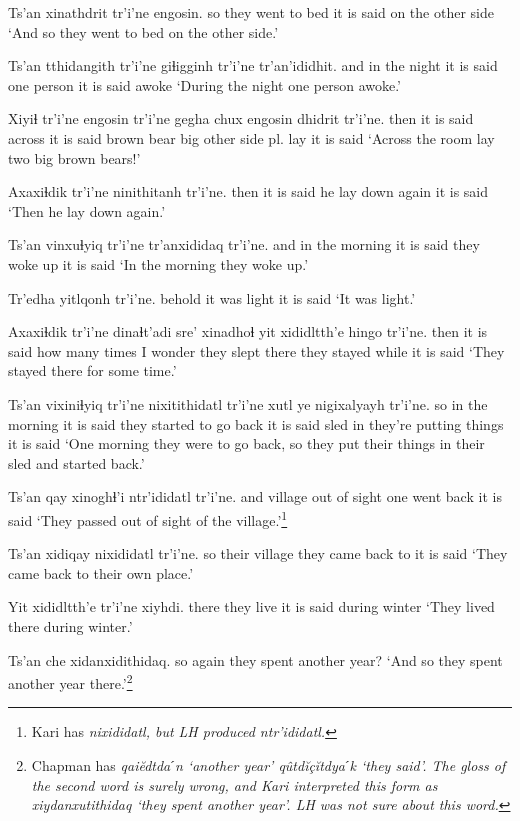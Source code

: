 \documentclass[12pt]{article}
\begin{document}
\gll Ts'an xinathdrit  tr'i'ne engosin.
so {they went to bed} {it is said} {on the other side}
\glt `And so they went to bed on the other side.'
\glend

\gll Ts'an tthidangith tr'i'ne giɬigginh tr'i'ne tr'an'ididhit.
and {in the night} {it is said} {one person} {it is said} awoke
\glt `During the night one person awoke.'
\glend

\gll Xiyiɬ tr'i'ne engosin tr'i'ne gegha  chux engosin  dhidrit tr'i'ne.
then {it is said} across  {it is said} {brown bear} big {other side} {pl. lay} {it is said}
\glt `Across the room lay two big brown bears!'
\glend

\gll Axaxiɬdik tr'i'ne ninithitanh  tr'i'ne.
then  {it is said} {he lay down again} {it is said}
\glt `Then he lay down again.'
\glend

\gll Ts'an vinxuɬyiq tr'i'ne tr'anxididaq tr'i'ne.
and {in the morning} {it is said} {they woke up} {it is said}
\glt `In the morning they woke up.'
\glend

\gll Tr'edha yitlqonh tr'i'ne.
behold  {it was light}  {it is said}
\glt `It was light.'
\glend

\gll Axaxiɬdik tr'i'ne dinaɬt'adi  sre' xinadhoɬ yit xididltth'e hingo tr'i'ne.
then  {it is said} {how many times} {I wonder} {they slept} there {they stayed} while {it is said}
\glt `They stayed there for some time.'
\glend

\gll Ts'an vixiniɬyiq tr'i'ne nixitithidatl   tr'i'ne xutl ye nigixalyayh tr'i'ne.
so {in the morning} {it is said} {they started to go back} {it is said} sled in {they're putting things} {it is said}
\glt `One morning they were to go back, so they put their things in their sled and started back.'
\glend

\gll Ts'an qay xinoghɬ'i ntr'ididatl tr'i'ne.
and village {out of sight} {one went back}  {it is said}
\glt `They passed out of sight of the village.'\footnote{Kari has \em nixididatl, \em but LH produced \em ntr'ididatl.}
\glend

\gll Ts'an xidiqay nixididatl tr'i'ne.
so {their village} {they came back to} {it is said}
\glt `They came back to their own place.'
\glend

\gll Yit xididltth'e tr'i'ne xiyhdi.
there {they live} {it is said} {during winter}
\glt `They lived there during winter.'
\glend

\gll Ts'an che xidanxidithidaq.
so again {they spent another year?}
\glt `And so they spent another year there.'\footnote{Chapman has \em qai\u{e}dtdaˊn \em `another year' \em q\^utd\u{i}\c{c}\u{i}tdyaˊk \em `they said'. The gloss of the second word is surely wrong, and Kari interpreted this form as \em xiydanxutithidaq \em `they spent another year'. LH was not sure about this word.}
\glend
\end{document}
